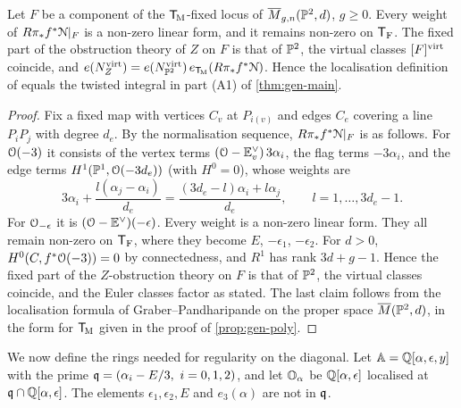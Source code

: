 \begin{lem}
\label{lem:gen-weights}
Let $F$ be a component of the $\mathsf{T}_{\!\mathrm{M}}$-fixed locus of $\overline{M}_{g,n}(\mathbb{P}^2,d)$, $g\geq0$. Every weight of $R\pi_*f^*\mathcal{N}|_F$ is a non-zero linear form, and it remains non-zero on $\mathsf{T}_{\mathrm{F}}$. The fixed part of the obstruction theory of $Z$ on $F$ is that of $\mathbb{P}^2$, the virtual classes $[F]^{\mathrm{virt}}$ coincide, and $e(N^{\mathrm{virt}}_Z)=e(N^{\mathrm{virt}}_{\mathbb{P}^2})\,e_{\mathsf{T}_{\!\mathrm{M}}}(R\pi_*f^*\mathcal{N})$. Hence the localisation definition of \cite{BS} equals the twisted integral in part (A1) of \cref{thm:gen-main}. 
\end{lem}
\begin{proof}
Fix a fixed map with vertices $C_v$ at $P_{i(v)}$ and edges $C_e$ covering a line $P_iP_j$ with degree $d_e$. By the normalisation sequence, $R\pi_*f^*\mathcal{N}|_F$ is as follows. For $\mathcal{O}(-3)$ it consists of the vertex terms $(\mathcal{O}-\mathbb{E}_v^\vee)\,3\alpha_i$, the flag terms $-3\alpha_i$, and the edge terms $H^1(\mathbb{P}^1,\mathcal{O}(-3d_e))$ (with $H^0=0$), whose weights are
\[
3\alpha_i+\frac{l(\alpha_j-\alpha_i)}{d_e}=\frac{(3d_e-l)\alpha_i+l\alpha_j}{d_e},\qquad l=1,\dots,3d_e-1.
\]
For $\mathcal{O}_{-\epsilon}$ it is $(\mathcal{O}-\mathbb{E}^\vee)(-\epsilon)$. Every weight is a non-zero linear form. They all remain non-zero on $\mathsf{T}_{\mathrm{F}}$, where they become $E$, $-\epsilon_1$, $-\epsilon_2$. For $d>0$, $H^0(C,f^*\mathcal{O}(-3))=0$ by connectedness, and $R^1$ has rank $3d+g-1$. Hence the fixed part of the $Z$-obstruction theory on $F$ is that of $\mathbb{P}^2$, the virtual classes coincide, and the Euler classes factor as stated. The last claim follows from the localisation formula of Graber--Pandharipande on the proper space $\overline{M}(\mathbb{P}^2,d)$, in the form for $\mathsf{T}_{\!\mathrm{M}}$ given in the proof of \cref{prop:gen-poly}.
\end{proof}

We now define the rings needed for regularity on the diagonal. Let $\mathbb{A}=\mathbb{Q}[\alpha,\epsilon,y]$ with the prime $\primeq=(\alpha_i-E/3,\ i=0,1,2)$, and let $\mathbb{O}_{\alpha}$ be $\mathbb{Q}[\alpha,\epsilon]$ localised at $\mathfrak{q}\cap\mathbb{Q}[\alpha,\epsilon]$. The elements $\epsilon_1,\epsilon_2,E$ and $e_3(\alpha)$ are not in $\mathfrak{q}$.


